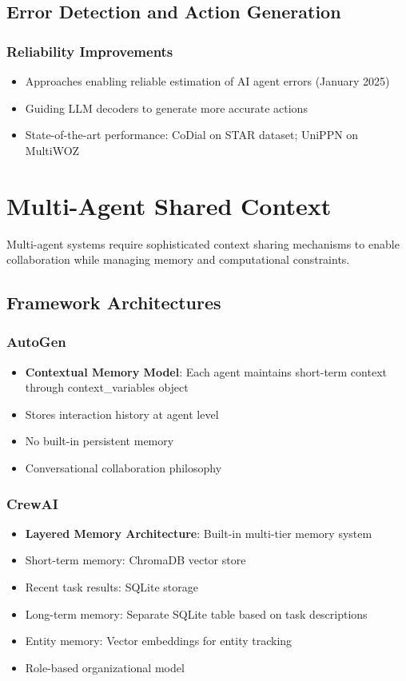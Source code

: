 \documentclass[11pt,letterpaper]{article}
\begin{document}
\subsection{Error Detection and Action Generation}

\subsubsection{Reliability Improvements}
\begin{itemize}[leftmargin=*]
    \item Approaches enabling reliable estimation of AI agent errors (January 2025)
    \item Guiding LLM decoders to generate more accurate actions
    \item State-of-the-art performance: CoDial on STAR dataset; UniPPN on MultiWOZ
\end{itemize}

\section{Multi-Agent Shared Context}

Multi-agent systems require sophisticated context sharing mechanisms to enable collaboration while managing memory and computational constraints.

\subsection{Framework Architectures}

\subsubsection{AutoGen}
\begin{itemize}[leftmargin=*]
    \item \textbf{Contextual Memory Model}: Each agent maintains short-term context through context\_variables object
    \item Stores interaction history at agent level
    \item No built-in persistent memory
    \item Conversational collaboration philosophy
\end{itemize}

\subsubsection{CrewAI}
\begin{itemize}[leftmargin=*]
    \item \textbf{Layered Memory Architecture}: Built-in multi-tier memory system
    \item Short-term memory: ChromaDB vector store
    \item Recent task results: SQLite storage
    \item Long-term memory: Separate SQLite table based on task descriptions
    \item Entity memory: Vector embeddings for entity tracking
    \item Role-based organizational model
\end{itemize}
\end{document}
